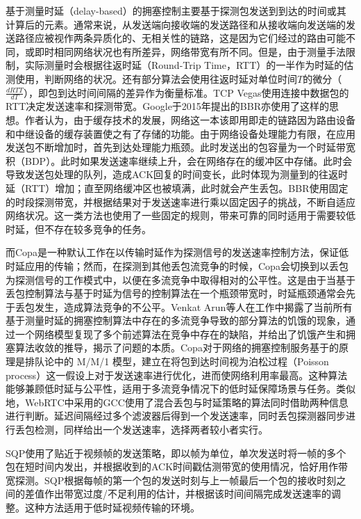 基于测量时延（delay-based）的拥塞控制主要基于探测包发送到到达的时间或其计算后的元素。通常来说，从发送端向接收端的发送路径和从接收端向发送端的发送路径应被视作两条异质化的、无相关性的链路，这是因为它们经过的路由可能不同，或即时相同网络状况也有所差异，网络带宽有所不同。但是，由于测量手法限制，实际测量时会根据往返时延（Round-Trip Time，RTT）的一半作为时延的估测使用，判断网络的状况。还有部分算法会使用往返时延对单位时间$T$的微分（$\frac{dRTT}{dT}$），即包到达时间间隔的差异作为衡量标准。TCP Vegas\cite{brakmo1994tcp}使用连接中数据包的RTT决定发送速率和探测带宽。Google于2015年提出的BBR\cite{cardwell2016bbr}亦使用了这样的思想。作者认为，由于缓存技术的发展，网络这一本该即用即走的链路因为路由设备和中继设备的缓存装置使之有了存储的功能。由于网络设备处理能力有限，在应用发送包不断增加时，首先到达处理能力瓶颈。此时发送出的包容量为一个时延带宽积（BDP）。此时如果发送速率继续上升，会在网络存在的缓冲区中存储。此时会导致发送包处理的队列，造成ACK回复的时间变长，此时体现为测量到的往返时延（RTT）增加；直至网络缓冲区也被填满，此时就会产生丢包。BBR使用固定的时段探测带宽，并根据结果对于发送速率进行乘以固定因子的挑战，不断自适应网络状况。这一类方法也使用了一些固定的规则，带来可靠的同时适用于需要较低时延，但不存在较多竞争的任务。

而Copa\cite{arun2018copa}是一种默认工作在以传输时延作为探测信号的发送速率控制方法，保证低时延应用的传输；然而，在探测到其他丢包流竞争的时候，Copa会切换到以丢包为探测信号的工作模式中，以便在多流竞争中取得相对的公平性。这是由于当基于丢包控制算法与基于时延为信号的控制算法在一个瓶颈带宽时，时延瓶颈通常会先于丢包发生，造成算法竞争的不公平。Venkat Arun等人在工作\cite{arun2022starvation}中揭露了当前所有基于测量时延的拥塞控制算法中存在的多流竞争导致的部分算法的饥饿的现象，通过一个网络模型复现了多个前述算法在竞争中存在的缺陷，并给出了饥饿产生和拥塞算法收敛的推导，揭示了问题的本质。Copa对于网络的拥塞控制服务基于的原理是排队论中的 M/M/1 模型，建立在将包到达时间视为泊松过程（Poisson process）这一假设上对于发送速率进行优化，进而使网络利用率最高。这种算法能够兼顾低时延与公平性，适用于多流竞争情况下的低时延保障场景与任务。类似地，WebRTC中采用的GCC\cite{carlucci2016analysis}使用了混合丢包与时延策略的算法同时借助两种信息进行判断。延迟间隔经过多个滤波器后得到一个发送速率，同时丢包探测器同步进行丢包检测，同样给出一个发送速率，选择两者较小者实行。

SQP\cite{ray2022sqp}使用了贴近于视频帧的发送策略，即以帧为单位，单次发送时将一帧的多个包在短时间内发出，并根据收到的ACK时间戳估测带宽的使用情况，恰好用作带宽探测。SQP根据每帧的第一个包的发送时刻与上一帧最后一个包的接收时刻之间的差值作出带宽过度/不足利用的估计，并根据该时间间隔完成发送速率的调整。这种方法适用于低时延视频传输的环境。

